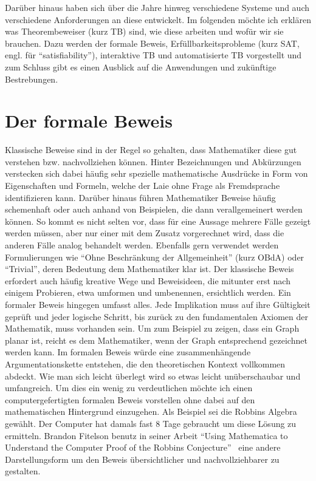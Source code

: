 Darüber hinaus haben sich über die Jahre hinweg verschiedene Systeme und auch verschiedene Anforderungen an diese entwickelt.
Im folgenden möchte ich erklären was Theorembeweiser (kurz TB) sind, wie diese arbeiten und wofür wir sie brauchen.
Dazu werden der formale Beweis, Erfüllbarkeitsprobleme (kurz SAT, engl. für \enquote{satisfiability}), interaktive TB und automatisierte TB vorgestellt und zum Schluss gibt es einen Ausblick auf die Anwendungen und zukünftige Bestrebungen.

\section{Der formale Beweis}
Klassische Beweise sind in der Regel so gehalten, dass Mathematiker diese gut
verstehen bzw. nachvollziehen können. Hinter Bezeichnungen und Abkürzungen
verstecken sich dabei häufig sehr spezielle mathematische Ausdrücke in Form von
Eigenschaften und Formeln, welche der Laie ohne Frage als Fremdsprache
identifizieren kann. Darüber hinaus führen Mathematiker Beweise häufig
schemenhaft oder auch anhand von Beispielen, die dann verallgemeinert werden
können. So kommt es nicht selten vor, dass für eine Aussage mehrere Fälle gezeigt
werden müssen, aber nur einer mit dem Zusatz vorgerechnet wird, dass die anderen
Fälle analog behandelt werden. Ebenfalls gern verwendet werden Formulierungen wie
\enquote{Ohne Beschränkung der Allgemeinheit} (kurz OBdA) oder \enquote{Trivial}, deren
Bedeutung dem Mathematiker klar ist. Der klassische Beweis erfordert auch häufig
kreative Wege und Beweisideen, die mitunter erst nach einigem Probieren, etwa
umformen und umbenennen, ersichtlich werden. Ein formaler Beweis hingegen
umfasst alles. Jede Implikation muss auf ihre Gültigkeit geprüft und jeder logische
Schritt, bis zurück zu den fundamentalen Axiomen der Mathematik, muss vorhanden
sein. Um zum Beispiel zu zeigen, dass ein Graph planar ist, reicht es dem
Mathematiker, wenn der Graph entsprechend gezeichnet werden kann. Im formalen
Beweis würde eine zusammenhängende Argumentationskette entstehen, die den
theoretischen Kontext vollkommen abdeckt. Wie man sich leicht überlegt wird so
etwas leicht unüberschaubar und umfangreich. Um dies ein wenig zu verdeutlichen
möchte ich einen computergefertigten formalen Beweis vorstellen ohne dabei auf den
mathematischen Hintergrund einzugehen.
Als Beispiel sei die Robbins Algebra gewählt. Der Computer hat damals fast 8 Tage gebraucht um diese Lösung zu ermitteln. Brandon Fitelson benutz in seiner Arbeit \enquote{Using Mathematica to Understand the Computer Proof of the Robbins Conjecture}~\cite{robinsconjecture} eine andere Darstellungsform um den Beweis übersichtlicher und nachvollziehbarer zu gestalten.
